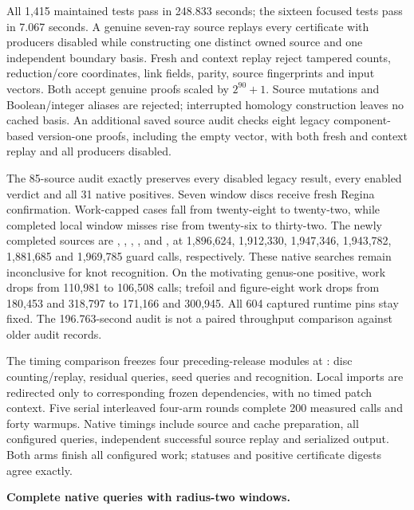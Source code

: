 All 1,415 maintained tests pass in 248.833 seconds; the sixteen focused
tests pass in 7.067 seconds. A genuine seven-ray source replays every
certificate with producers disabled while constructing one distinct owned
source and one independent boundary basis. Fresh and context replay reject
tampered counts, reduction/core coordinates, link fields, parity, source
fingerprints and input vectors. Both accept genuine proofs scaled by
$2^{90}+1$. Source mutations and Boolean/integer aliases are rejected;
interrupted homology construction leaves no cached basis.
An additional saved source audit checks eight legacy component-based
version-one proofs, including the empty vector, with both fresh and context
replay and all producers disabled.

The 85-source audit exactly preserves every disabled legacy result, every
enabled verdict and all 31 native positives. Seven window discs receive
fresh Regina confirmation. Work-capped cases fall from twenty-eight to
twenty-two, while completed local window misses rise from twenty-six to
thirty-two. The newly completed sources are ,
, , , 
and , at 1,896,624, 1,912,330, 1,947,346, 1,943,782,
1,881,685 and 1,969,785 guard calls, respectively. These native searches
remain inconclusive for knot recognition. On the motivating genus-one
positive, work drops from 110,981 to 106,508 calls; trefoil and figure-eight
work drops from 180,453 and 318,797 to 171,166 and 300,945. All 604 captured
runtime pins stay fixed. The 196.763-second audit is not a paired throughput
comparison against older audit records.

The timing comparison freezes four preceding-release modules at
: disc counting/replay, residual queries, seed queries
and recognition. Local imports are redirected only to corresponding frozen
dependencies, with no timed patch context. Five serial interleaved four-arm
rounds complete 200 measured calls and forty warmups. Native timings include
source and cache preparation, all configured queries, independent successful
source replay and serialized output. Both arms finish all configured work;
statuses and positive certificate digests agree exactly.

\begin{samepage}
\noindent\textbf{Complete native queries with radius-two windows.}

\end{samepage}

